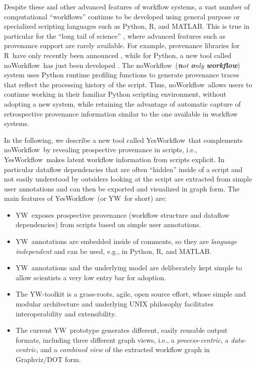 \documentclass[15]{idcc}
\newcommand{\NW}{\textsf{noWorkflow}}
\newcommand{\YW}{\textsf{YesWorkflow}}
\newcommand{\yw}{\textsf{YW}}
\newcommand{\R}{R}
\newcommand{\MATLAB}{MATLAB}
\begin{document}
Despite these and other advanced features of workflow systems,
a vast number of computational ``workflows'' continue to be developed
using general purpose or specialized scripting languages such as
Python, \R, and \MATLAB. This is true in particular for the ``long
tail of science'' \cite{wallis2013if,Heidorn2008Shedding}, where
advanced features such as provenance support are rarely available.
For example, provenance libraries for \R\ have only recently been
announced \cite{Lerner2014RDataTracker}, while for Python, a new tool
called \NW\ has just been developed \cite{murta2014noWorkflow}. The
\NW\ (\emph{\textbf{n}ot \textbf{o}nly \textbf{workflow}}) system uses
Python runtime profiling functions to generate provenance traces that
reflect the processing history of the script. Thus, \NW\ allows users
to continue working in their familiar Python scripting environment,
without adopting a new system, while retaining the advantage of
automatic capture of retrospective provenance information similar to
the one available in workflow systems.

In the following, we describe a new tool called \YW\  that
complements \NW\ by revealing prospective provenance in
scripts, i.e., \YW\ makes latent workflow information from scripts explicit. In
particular dataflow dependencies that are often ``hidden'' inside of a
script and not easily understood by outsiders looking at the script
are extracted from simple user annotations and can then be exported
and visualized in graph form. 
The main features of \YW\ (or \yw\ for short) are:
\begin{itemize}
\item \yw\ exposes prospective provenance (workflow structure and
  dataflow dependencies) from scripts based on simple user annotations.
\item \yw\ annotations are embedded inside of comments, so they
  are \emph{language independent} and can be used, e.g., in Python, \R,
  and \MATLAB.
\item \yw\ annotations and the underlying model are deliberately kept
  simple to allow scientists a very low entry bar for adoption.

\item The \yw-toolkit is a grass-roots, agile, open source effort, whose
 simple and modular architecture and underlying UNIX philosophy
 facilitates interoperability and extensibility.

\item The current \yw\ prototype generates different, easily reusable
  output formats, including three different graph views, i.e., a
  \emph{process-centric}, a \emph{data-centric}, and a \emph{combined
    view} of the extracted workflow graph in Graphviz/DOT form.
 \end{itemize}
\end{document}
